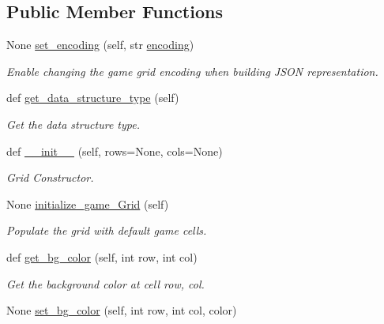 \subsection*{Public Member Functions}
\begin{DoxyCompactItemize}
\item 
None \mbox{\hyperlink{classbridges_1_1game__grid_1_1_game_grid_adb8fb6a915984c798cf1a59fcd5122f7}{set\+\_\+encoding}} (self, str \mbox{\hyperlink{classbridges_1_1game__grid_1_1_game_grid_a0a5df7403a43cdc54045a4999042ad99}{encoding}})
\begin{DoxyCompactList}\small\item\em Enable changing the game grid encoding when building J\+S\+ON representation. \end{DoxyCompactList}\item 
def \mbox{\hyperlink{classbridges_1_1game__grid_1_1_game_grid_a0a38f422a54e93cfd2816e0051fb8d5a}{get\+\_\+data\+\_\+structure\+\_\+type}} (self)
\begin{DoxyCompactList}\small\item\em Get the data structure type. \end{DoxyCompactList}\item 
def \mbox{\hyperlink{classbridges_1_1game__grid_1_1_game_grid_a9f01ebe1e63708af7e8f1baab430a3cc}{\+\_\+\+\_\+init\+\_\+\+\_\+}} (self, rows=None, cols=None)
\begin{DoxyCompactList}\small\item\em Grid Constructor. \end{DoxyCompactList}\item 
None \mbox{\hyperlink{classbridges_1_1game__grid_1_1_game_grid_a54a27dd797ab47d03d2f98b8f3e319c1}{initialize\+\_\+game\+\_\+\+Grid}} (self)
\begin{DoxyCompactList}\small\item\em Populate the grid with default game cells. \end{DoxyCompactList}\item 
def \mbox{\hyperlink{classbridges_1_1game__grid_1_1_game_grid_a832152905603c62aae8c23264b1ab030}{get\+\_\+bg\+\_\+color}} (self, int row, int col)
\begin{DoxyCompactList}\small\item\em Get the background color at cell row, col. \end{DoxyCompactList}\item 
None \mbox{\hyperlink{classbridges_1_1game__grid_1_1_game_grid_ac3622d877ccb7d955baf279ebf849557}{set\+\_\+bg\+\_\+color}} (self, int row, int col, color)

\end{DoxyCompactItemize}
